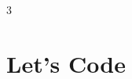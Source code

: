 \documentclass[a4paper,landscape,20pt]{article}
\begin{document}
\begin{multicols}{3}

\section*{Let's Code}

\begin{lstlisting}

\end{lstlisting}

\end{multicols}
\end{document}
